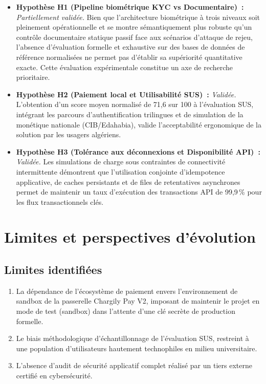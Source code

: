 \begin{itemize}[leftmargin=1.8em]
  \item \textbf{Hypothèse H1 (Pipeline biométrique KYC vs Documentaire)~:} \textit{Partiellement validée.} Bien que l'architecture biométrique à trois niveaux soit pleinement opérationnelle et se montre sémantiquement plus robuste qu'un contrôle documentaire statique passif face aux scénarios d'attaque de rejeu, l'absence d'évaluation formelle et exhaustive sur des bases de données de référence normalisées ne permet pas d'établir sa supériorité quantitative exacte. Cette évaluation expérimentale constitue un axe de recherche prioritaire.
  \item \textbf{Hypothèse H2 (Paiement local et Utilisabilité SUS)~:} \textit{Validée.} L'obtention d'un score moyen normalisé de 71,6 sur 100 à l'évaluation SUS, intégrant les parcours d'authentification trilingues et de simulation de la monétique nationale (CIB/Edahabia), valide l'acceptabilité ergonomique de la solution par les usagers algériens.
  \item \textbf{Hypothèse H3 (Tolérance aux déconnexions et Disponibilité API)~:} \textit{Validée.} Les simulations de charge sous contraintes de connectivité intermittente démontrent que l'utilisation conjointe d'idempotence applicative, de caches persistants et de files de retentatives asynchrones permet de maintenir un taux d'exécution des transactions API de 99,9\,\% pour les flux transactionnels clés.
\end{itemize}

\section*{Limites et perspectives d'évolution}

\subsection*{Limites identifiées}
\begin{enumerate}[leftmargin=1.8em]
  \item La dépendance de l'écosystème de paiement envers l'environnement de sandbox de la passerelle Chargily Pay V2, imposant de maintenir le projet en mode de test (sandbox) dans l'attente d'une clé secrète de production formelle.
  \item Le biais méthodologique d'échantillonnage de l'évaluation SUS, restreint à une population d'utilisateurs hautement technophiles en milieu universitaire.
  \item L'absence d'audit de sécurité applicatif complet réalisé par un tiers externe certifié en cybersécurité.
\end{enumerate}

